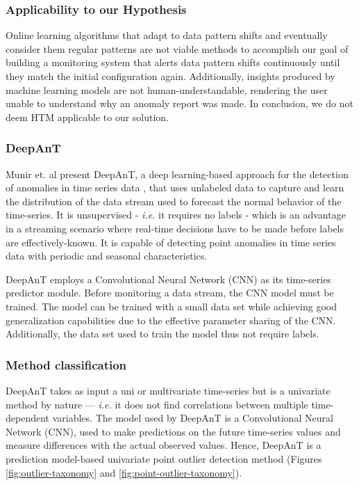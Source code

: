 \subsubsection*{Applicability to our Hypothesis}
Online learning algorithms that adapt to data pattern shifts and eventually consider them regular patterns are not viable methods to accomplish our goal of building a monitoring system that alerts data pattern shifts continuously until they match the initial configuration again. Additionally, insights produced by machine learning models are not human-understandable, rendering the user unable to understand why an anomaly report was made. In conclusion, we do not deem HTM applicable to our solution.


\subsubsection{DeepAnT}
Munir et. al present DeepAnT, a deep learning-based approach for the detection of anomalies in time series data \cite{Munir-DeepAnT}, that uses unlabeled data to capture and learn the distribution of the data stream used to forecast the normal behavior of the time-series. It is unsupervised - \textit{i.e.} it requires no labels - which is an advantage in a streaming scenario where real-time decisions have to be made before labels are effectively-known. It is capable of detecting point anomalies in time series data with periodic and seasonal characteristics.

DeepAnT employs a Convolutional Neural Network (CNN) as its time-series predictor module. Before monitoring a data stream, the CNN model must be trained. The model can be trained with a small data set while achieving good generalization capabilities due to the effective parameter sharing of the CNN. Additionally, the data set used to train the model thus not require labels.

\subsubsection*{Method classification}
DeepAnT takes as input a uni or multivariate time-series but is a univariate method by nature --- \textit{i.e.} it does not find correlations between multiple time-dependent variables. The model used by DeepAnT is a Convolutional Neural Network (CNN), used to make predictions on the future time-series values and measure differences with the actual observed values. Hence, DeepAnT is a prediction model-based univariate point outlier detection method (Figures \ref{fig:outlier-taxonomy} and \ref{fig:point-outlier-taxonomy}).

